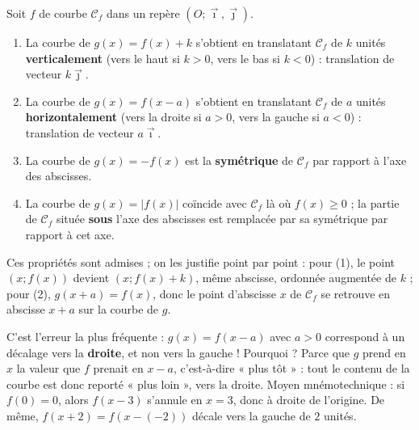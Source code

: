 \documentclass[11pt]{article}
\begin{document}
\begin{propriete}
Soit $f$ de courbe $\mathcal{C}_f$ dans un repère $(O ; \vec{\imath}, \vec{\jmath})$.
\begin{enumerate}
\item La courbe de $g(x) = f(x) + k$ s'obtient en translatant $\mathcal{C}_f$ de $k$ unités \textbf{verticalement} (vers le haut si $k > 0$, vers le bas si $k < 0$) : translation de vecteur $k\vec{\jmath}$.
\item La courbe de $g(x) = f(x - a)$ s'obtient en translatant $\mathcal{C}_f$ de $a$ unités \textbf{horizontalement} (vers la droite si $a > 0$, vers la gauche si $a < 0$) : translation de vecteur $a\vec{\imath}$.
\item La courbe de $g(x) = -f(x)$ est la \textbf{symétrique} de $\mathcal{C}_f$ par rapport à l'axe des abscisses.
\item La courbe de $g(x) = |f(x)|$ coïncide avec $\mathcal{C}_f$ là où $f(x) \geq 0$ ; la partie de $\mathcal{C}_f$ située \textbf{sous} l'axe des abscisses est remplacée par sa symétrique par rapport à cet axe.
\end{enumerate}
Ces propriétés sont admises ; on les justifie point par point : pour (1), le point $(x ; f(x))$ devient $(x ; f(x) + k)$, même abscisse, ordonnée augmentée de $k$ ; pour (2), $g(x + a) = f(x)$, donc le point d'abscisse $x$ de $\mathcal{C}_f$ se retrouve en abscisse $x + a$ sur la courbe de $g$.
\end{propriete}

\begin{attention}
C'est l'erreur la plus fréquente : $g(x) = f(x - a)$ avec $a > 0$ correspond à un décalage vers la \textbf{droite}, et non vers la gauche ! Pourquoi ? Parce que $g$ prend en $x$ la valeur que $f$ prenait en $x - a$, c'est-à-dire « plus tôt » : tout le contenu de la courbe est donc reporté « plus loin », vers la droite. Moyen mnémotechnique : si $f(0) = 0$, alors $f(x - 3)$ s'annule en $x = 3$, donc à droite de l'origine. De même, $f(x + 2) = f(x - (-2))$ décale vers la gauche de $2$ unités.
\end{attention}
\end{document}
